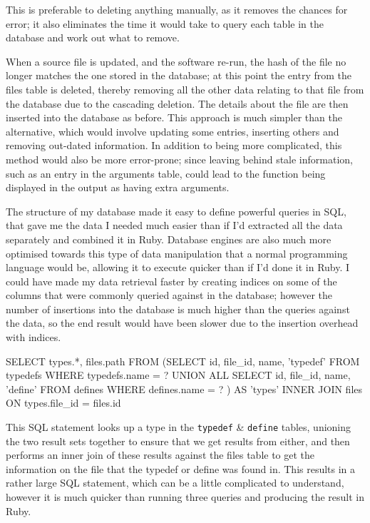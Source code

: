     This is preferable to deleting anything manually, as it removes the
    chances for error; it also eliminates the time it would take to query each
    table in the database and work out what to remove.

    When a source file is updated, and the software re-run, the hash of the file
    no longer matches the one stored in the database; at this point the entry
    from the files table is deleted, thereby removing all the other data
    relating to that file from the database due to the cascading deletion. The
    details about the file are then inserted into the database as before. This
    approach is much simpler than the alternative, which would involve
    updating some entries, inserting others and removing out-dated
    information. In addition to being more complicated, this method would also
    be more error-prone; since leaving behind stale information, such as an
    entry in the arguments table, could lead to the function being displayed
    in the output as having extra arguments.

    The structure of my database made it easy to define powerful queries in
    SQL, that gave me the data I needed much easier than if I'd extracted all
    the data separately and combined it in Ruby. Database engines are also
    much more optimised towards this type of data manipulation that a normal
    programming language would be, allowing it to execute quicker than if I'd
    done it in Ruby. I could have made my data retrieval faster by creating
    indices on some of the columns that were commonly queried against in the
    database; however the number of insertions into the database is much
    higher than the queries against the data, so the end result would have
    been slower due to the insertion overhead with indices.

    \begin{code}[language=sql, gobble=6]
      SELECT types.*, files.path FROM
       (SELECT id, file_id, name, 'typedef' FROM typedefs WHERE typedefs.name = ?
        UNION ALL
        SELECT id, file_id, name, 'define' FROM defines WHERE defines.name = ?
       ) AS 'types' INNER JOIN files ON types.file_id = files.id
    \end{code}

    This SQL statement looks up a type in the \lstinline|typedef| \&
    \lstinline|define| tables, unioning the two result sets together to ensure
    that we get results from either, and then performs an inner join of these
    results against the files table to get the information on the file that the
    typedef or define was found in. This results in a rather large SQL
    statement, which can be a little complicated to understand, however it is
    much quicker than running three queries and producing the result in Ruby.

